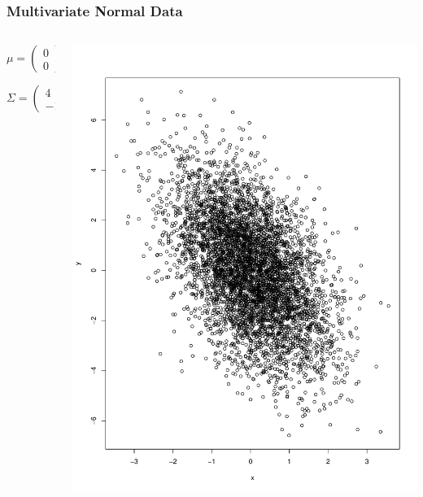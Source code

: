 \documentclass[english,xcolor={dvipsnames},aspectratio=169]{beamer}
\begin{document}
  \begin{frame}
\frametitle{Multivariate Normal Data}
\begin{columns}
\begin{column}{0.4\textwidth}
\[
\mu=\left(\begin{array}{c}
0\\
0
\end{array}\right)
\]

\[
\Sigma=\left(\begin{array}{cc}
4 & -1\\
-1 & 1
\end{array}\right)
\]
\end{column}
\begin{column}{0.6\textwidth} 
    \begin{center}
\includegraphics[width=.8\textwidth]{mvnormal_scatter.pdf}
     \end{center}
\end{column}
\end{columns}
\end{frame}


\end{document}
